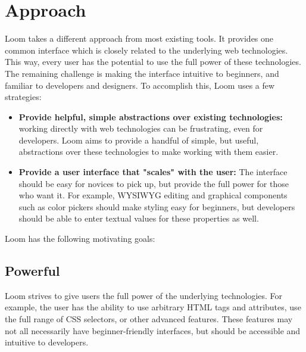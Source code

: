 \documentclass[conference, letterpaper]{IEEEtran}
\begin{document}
\section{Approach}
Loom takes a different approach from most existing tools. It provides one common interface which is closely related to the underlying web technologies. This way, every user has the potential to use the full power of these technologies. The remaining challenge is making the interface intuitive to beginners, and familiar to developers and designers. To accomplish this, Loom uses a few strategies:
\begin{itemize}
  \item \textbf{Provide helpful, simple abstractions over existing technologies:} working directly with web technologies can be frustrating, even for developers. Loom aims to provide a handful of simple, but useful, abstractions over these technologies to make working with them easier.
  \item \textbf{Provide a user interface that "scales" with the user:} The interface should be easy for novices to pick up, but provide the full power for those who want it. For example, WYSIWYG editing and graphical components such as color pickers should make styling easy for beginners, but developers should be able to enter textual values for these properties as well.
\end{itemize}


Loom has the following motivating goals:

\subsection{Powerful}
Loom strives to give users the full power of the underlying technologies. For example, the user has the ability to use arbitrary HTML tags and attributes, use the full range of CSS selectors, or other advanced features. These features may not all necessarily have beginner-friendly interfaces, but should be accessible and intuitive to developers.
\end{document}
